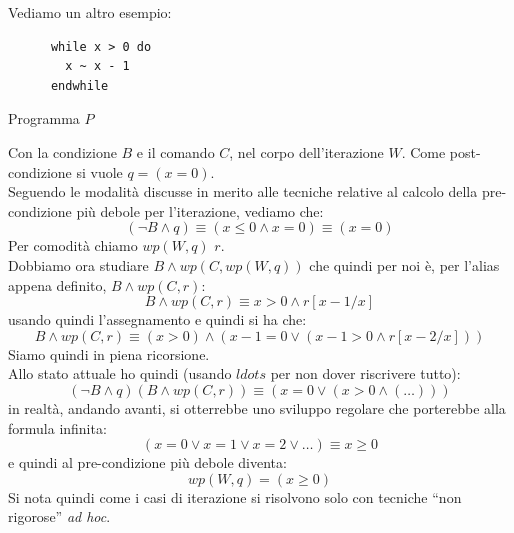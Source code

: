 				      				\begin{esempio}
				      					Vediamo un altro esempio:
				      					\begin{listing}[H]
				      						\begin{lstlisting}
      while x > 0 do
        x ~ x - 1
      endwhile
				      						\end{lstlisting}
				      						\caption{Programma $P$}
				      					\end{listing}
				      					Con la condizione $B$ e il comando $C$, nel corpo dell'iterazione $W$. Come
				      					post-condizione si vuole $q=(x=0)$.\\
				      					Seguendo le modalità discusse in merito alle tecniche relative al calcolo
				      					della pre-condizione più debole per l'iterazione, vediamo che:
				      					\[(\neg B\land q)\equiv (x\leq 0\land x=0)\equiv (x=0)\]
				      					Per comodità chiamo $wp(W,q)$ $r$.\\ 
				      					Dobbiamo ora studiare $B\land wp(C,wp(W,q))$ che quindi per noi è, per l'alias
				      					appena definito, $B\land wp(C,r)$:
				      					\[B\land wp(C,r)\equiv x>0\land r[x-1/x]\]
				      					usando quindi l'assegnamento e quindi si ha che:
				      					\[B\land wp(C,r)\equiv (x>0)\land (x-1=0\lor (x-1>0\land r[x-2/x]))\]
				      					Siamo quindi in piena ricorsione.\\
				      					Allo stato attuale ho quindi (usando $ldots$ per non dover riscrivere tutto):
				      					\[(\neg B\land q)(B\land wp(C,r))\equiv (x=0 \lor(x>0\land(\ldots)))\]
				      					in realtà, andando avanti, si otterrebbe uno sviluppo regolare che porterebbe
				      					alla formula infinita:
				      					\[(x=0\lor x=1\lor x=2\lor \ldots)\equiv x\geq 0\]
				      					e quindi al pre-condizione più debole diventa:
				      					\[wp(W,q)=(x\geq 0)\]
				      					Si nota quindi come i casi di iterazione si risolvono solo con tecniche ``non
				      					rigorose'' \textit{ad hoc}.
				      				\end{esempio}
